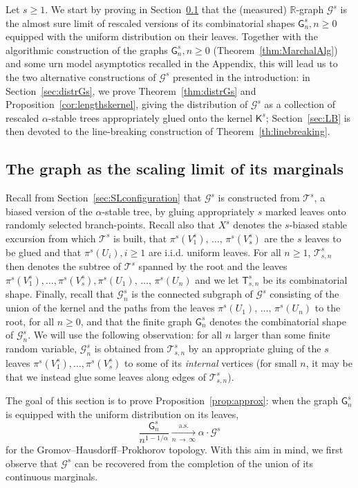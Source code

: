 \documentclass[AHL,Unicode,longabstracts,published]{cedram}
\newcommand{\cG}{\mathcal{G}}
\newcommand{\cT}{\mathcal{T}}
\newcommand{\sG}{\mathsf{G}}
\newcommand{\sT}{\mathsf{T}}
\newcommand{\sK}{\mathsf{K}}
\newcommand{\R}{\mathbb{R}}
\newcommand{\R}{\mathbb{R}}
\begin{document}
Let $s \geq 1$. We start by proving in Section~\ref{sec:approx} that the (measured) $\R$-graph $\cG^s$ is the almost sure limit of rescaled versions of its combinatorial shapes $\sG_n^s, n \geq 0$ equipped with the uniform distribution on their leaves. Together with the algorithmic construction of the graphs $\sG_n^s, n \geq 0$ (Theorem~\ref{thm:MarchalAlg}) and some urn model asymptotics recalled in the Appendix, this will lead us to the two alternative constructions of $\cG^s$ presented in the introduction: in Section~\ref{sec:distrGs}, we prove Theorem~\ref{thm:distrGs} and Proposition~\ref{cor:lengthskernel}, giving the distribution of $\cG^s$ as a collection of rescaled $\alpha$-stable trees appropriately glued onto the kernel $\sK^s$; Section~\ref{sec:LB} is then devoted to the line-breaking construction of Theorem~\ref{th:linebreaking}.


\subsection{The graph as the scaling limit of its marginals}\label{sec:approx}

Recall from Section~\ref{sec:SLconfiguration} that $\cG^s$ is constructed from $\cT^s$, a biased version of the $\alpha$-stable tree, by gluing appropriately $s$ marked leaves onto randomly selected branch-points. Recall also that $X^s$ denotes the $s$-biased stable excursion from which $\cT^s$ is built, that $\pi^s(V_1^s),\,\ldots,\,\pi^s(V_s^s)$ are the $s$ leaves to be glued and that $\pi^s(U_i), i \ge 1$ are i.i.d. uniform leaves. For all $n\geq 1$, $\cT^s_{s,n}$ then denotes the subtree of $\cT^s$ spanned by the root and the leaves $\pi^s(V_1^s), \ldots, \pi^s(V_s^s), \pi^s(U_1),\,\ldots,\, \pi^s(U_n)$ and we let $\sT^{s}_{s,n}$ be its combinatorial shape. Finally, recall that $\cG_n^s$ is the connected subgraph of $\cG^s$ consisting of the union of the kernel and the paths from the leaves $\pi^s(U_1),\,\ldots,\,\pi^s(U_n)$ to the root, for all $n \geq 0$, and that the finite graph $\sG_n^s$ denotes the combinatorial shape of $\cG_n^s$. We will use the following observation: for all $n$ larger than some finite random variable, $\cG_n^s$ is obtained from $\cT^s_{s,n}$ by an appropriate gluing of the $s$ leaves $\pi^s(V_1^s),\ldots,\pi^s(V_s^s)$ to some of its \emph{internal} vertices (for small $n$, it may be that we instead glue some leaves along edges of $\cT^s_{s,n}$).

The goal of this section is to prove Proposition~\ref{prop:approx}: when the graph $\sG_n^s$ is equipped with the uniform distribution on its leaves,
\begin{equation}\label{cv:GHPgraph}
\frac{\sG_n^s}{n^{1-1/\alpha}} \underset{n\, \rightarrow\,\infty}{\overset{\text{a.s.}}\longrightarrow} \alpha \cdot\cG^s
\end{equation}
for the Gromov--Hausdorff--Prokhorov topology. With this aim in mind, we first observe that $\cG^s$ can be recovered from the completion of the union of its continuous marginals.
\end{document}
